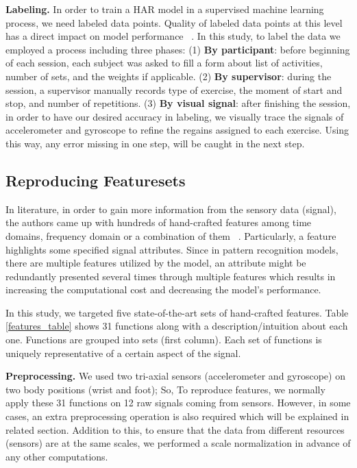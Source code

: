 \documentclass[journal,article,submit,moreauthors,pdftex]{Definitions/mdpi}
\begin{document}

\noindent \textbf{Labeling.} In order to train a HAR model in a supervised machine learning process, we need labeled data points. Quality of labeled data points at this level has a direct impact on model performance ~\cite{janidarmian2017comprehensive}. In this study, 
to label the data we employed a process including three phases: (1) \textbf{By participant}: before beginning of each session, each subject was asked to fill a form about list of activities, number of sets, and the weights if applicable. (2) \textbf{By supervisor}: during the session, a supervisor manually records type of exercise, the moment of start and stop, and number of repetitions. (3) \textbf{By visual signal}: after finishing the session, in order to have our desired accuracy in labeling, we visually trace the signals of accelerometer and gyroscope to refine the regains assigned to each exercise. Using this way, any error missing in one step, will be caught in the next step.


\subsection{Reproducing Featuresets}
\label{sec:feature_extraction}



In literature, in order to gain more information from the sensory data (signal), the authors came up with hundreds of hand-crafted features among time domains, frequency domain or a combination of them ~\cite{wang2019survey}. Particularly, a feature highlights some specified signal attributes. Since in pattern recognition models, there are multiple features utilized by the model, an attribute might be redundantly presented several times through multiple features which results in increasing the computational cost and decreasing the model's performance.



In this study, we targeted five state-of-the-art sets of hand-crafted features. Table \ref{features_table} shows 31 functions along with a description/intuition about each one. Functions are grouped into sets (first column). Each set of functions is uniquely representative of a certain aspect of the signal.

\noindent\textbf{Preprocessing.} We used two tri-axial sensors (accelerometer and gyroscope) on two body positions (wrist and foot); So, To reproduce features, we normally apply these 31 functions on 12 raw signals coming from sensors. However, in some cases, an extra preprocessing operation is also required which will be explained in related section. Addition to this, to ensure that the data from different resources (sensors) are at the same scales, we performed a scale normalization in advance of any other computations.
\end{document}
